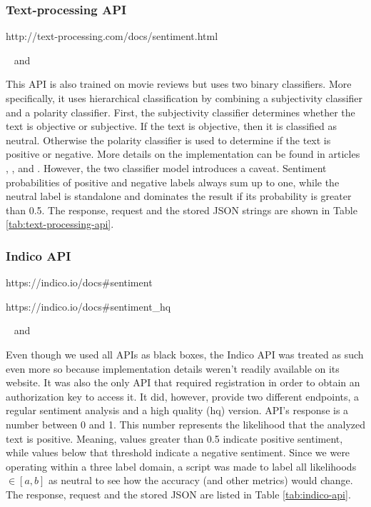 \subsubsection*{Text-processing API}
\begin{description}
\singlespacing
 \item[Web url:] http://text-processing.com/docs/sentiment.html
 \item[Database columns:]  and 
\end{description}
This API is also trained on movie reviews but uses two binary classifiers. More specifically, it uses hierarchical classification by combining a subjectivity classifier and a polarity classifier. First, the subjectivity classifier determines whether the text is objective or subjective. If the text is objective, then it is classified as neutral. Otherwise the polarity classifier is used to determine if the text is positive or negative.  More details on the implementation can be found in articles  \cite{NaiveBayes}, \cite{Stopwords}, \cite{LowInformationFeatures} and \cite{HierarchicalClassification}.
However, the two classifier model introduces a caveat. Sentiment probabilities of positive and negative labels always sum up to one, while the neutral label is standalone and dominates the result if its probability is greater than 0.5.
The response, request and the stored JSON strings are shown in Table \ref{tab:text-processing-api}.


\newpage

\subsubsection*{Indico API}
\begin{description}
\singlespacing
 \item[Web url:] https://indico.io/docs\#sentiment 
 \item[Web url (hq):] https://indico.io/docs\#sentiment\_hq 
 \item[Database columns:]  and 
\end{description}
Even though we used all APIs as black boxes, the Indico API was treated as such even more so because implementation details weren't readily available on its website. 
It was also the only API that required registration in order to obtain an authorization key to access it. 
It did, however, provide two different endpoints, a regular sentiment analysis and a high quality (hq) version.
API's response is a number between 0 and 1. 
This number represents the likelihood that the analyzed text is positive. 
Meaning, values greater than 0.5 indicate positive sentiment, while values below that threshold indicate a negative sentiment. 
Since we were operating within a three label domain, a script was made to label all likelihoods $\in[a,b]$ as neutral to see how the accuracy (and other metrics) would change.
The response, request and the stored JSON are listed in Table \ref{tab:indico-api}.


